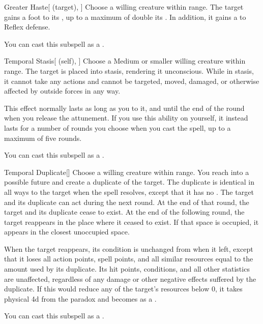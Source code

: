 \begin{ability}[\nth{3}]{Greater Haste}[ (target), ]
Choose a willing creature within \rngmed range.
The target gains a  foot  to its , up to a maximum of double its .
In addition, it gains a   to Reflex defense.

You can cast this subspell as a .
\end{ability}
\vspace{0.25em}



\begin{ability}[\nth{3}]{Temporal Stasis}[ (self), ]
Choose a Medium or smaller willing creature within \rngmed range.
The target is placed into stasis, rendering it unconscious.
While in stasis, it cannot take any actions and cannot be targeted, moved, damaged, or otherwise affected by outside forces in any way.

This effect normally lasts as long as you  to it, and until the end of the round when you release the attunement.
If you use this ability on yourself, it instead lasts for a number of rounds you choose when you cast the spell, up to a maximum of five rounds.

You can cast this subspell as a .
\end{ability}
\vspace{0.25em}



\begin{ability}[\nth{4}]{Temporal Duplicate}[]
Choose a willing creature within \rngmed range.
You reach into a possible future and create a duplicate of the target.
The duplicate is identical in all ways to the target when the spell resolves, except that it has no .
The target and its duplicate can act during the next round.
At the end of that round, the target and its duplicate cease to exist.
At the end of the following round, the target reappears in the place where it ceased to exist.
If that space is occupied, it appears in the closest unoccupied space.

When the target reappears, its condition is unchanged from when it left, except that it loses all action points, spell points, and all similar resources equal to the amount used by its duplicate.
Its hit points, conditions, and all other statistics are unaffected, regardless of any damage or other negative effects suffered by the duplicate.
If this would reduce any of the target's resources below 0, it takes physical  \plus4d from the paradox and becomes  as a .

You can cast this subspell as a .
\end{ability}
\vspace{0.25em}




